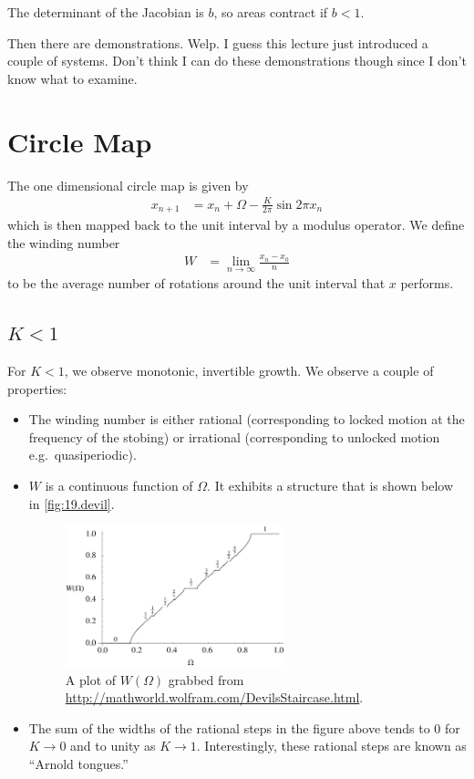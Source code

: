\documentclass[12pt]{article}
\begin{document}
The determinant of the Jacobian is $b$, so areas contract if $b < 1$.

Then there are demonstrations. Welp. I guess this lecture just introduced a
couple of systems. Don't think I can do these demonstrations though since I
don't know what to examine.

\clearpage

\section{Circle Map}

The one dimensional circle map is given by
\begin{align}
    x_{n+1} &= x_n + \Omega - \frac{K}{2\pi}\sin 2\pi x_n
\end{align}
which is then mapped back to the unit interval by a modulus operator. We define
the winding number
\begin{align}
    W &= \lim_{n \to \infty} \frac{x_n - x_0}{n}
\end{align}
to be the average number of rotations around the unit interval that $x$
performs.

\subsection{$K < 1$}

For $K < 1$, we observe monotonic, invertible growth. We observe a couple of
properties:
\begin{itemize}
    \item The winding number is either rational (corresponding to locked motion
        at the frequency of the stobing) or irrational (corresponding to
        unlocked motion e.g.\ quasiperiodic).

    \item $W$ is a continuous function of $\Omega$. It exhibits a structure
        that is shown below in \autoref{fig:19.devil}.
        \begin{figure}[!h]
            \centering
            \includegraphics[width=0.6\textwidth]{media/Devil.png}
            \caption{A plot of $W(\Omega)$ grabbed from
            \url{http://mathworld.wolfram.com/DevilsStaircase.html}.\label{fig:19.devil}}
        \end{figure}

    \item The sum of the widths of the rational steps in the figure above tends
        to $0$ for $K \to 0$ and to unity as $K \to 1$. Interestingly, these
        rational steps are known as ``Arnold tongues.''
\end{itemize}
\end{document}
